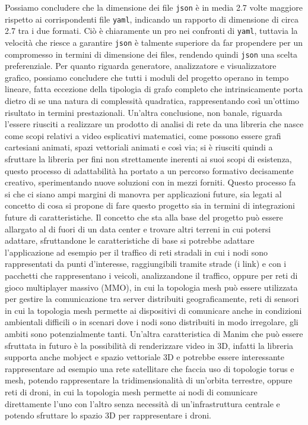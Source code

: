 \documentclass[binding=0.6cm]{sapthesis}
\begin{document}
Possiamo concludere che la dimensione dei file \texttt{json} è in media 2.7 volte maggiore rispetto ai corrispondenti file \texttt{yaml}, 
indicando un rapporto di dimensione di circa 2.7 tra i due formati. Ciò è chiaramente un pro nei confronti di \texttt{yaml}, tuttavia la velocità che riesce a garantire \texttt{json} è talmente 
superiore da far propendere per un compromesso in termini di dimensione dei files, rendendo quindi \texttt{json} una scelta preferenziale.
Per quanto riguarda generatore, analizzatore e visualizzatore grafico, possiamo concludere che tutti i moduli del progetto operano in tempo lineare, fatta eccezione della tipologia di grafo completo che intrinsicamente porta dietro di se una natura di complessità quadratica,
rappresentando così un'ottimo risultato in termini prestazionali.
Un'altra conclusione, non banale, riguarda l'essere riusciti a realizzare un prodotto di analisi di rete da una libreria che nasce come scopi relativi a video esplicativi matematici, come possono essere grafi cartesiani animati, spazi vettoriali animati e così via;
si è riusciti quindi a sfruttare la libreria per fini non strettamente inerenti ai suoi scopi di esistenza, questo processo di adattabilità ha portato a un percorso formativo decisamente creativo, sperimentando nuove soluzioni con in mezzi forniti.
Questo processo fa si che ci siano ampi margini di manovra per applicazioni future, 
sia legati al concetto di cosa si propone di fare questo progetto sia in termini di integrazioni future di caratteristiche. 
Il concetto che sta alla base del progetto può essere allargato al di fuori di un data center e trovare
altri terreni in cui potersi adattare, sfruttandone le caratteristiche di base si potrebbe adattare l'applicazione ad esempio per il traffico di reti stradali in cui 
i nodi sono rappresentati da punti d'interesse, raggiungibili tramite strade (i link) e con i pacchetti che rappresentano i veicoli, analizzandone il traffico, oppure per reti di gioco multiplayer massivo (MMO), in cui la topologia mesh può essere utilizzata per gestire la comunicazione tra server distribuiti geograficamente, reti di sensori 
in cui la topologia mesh permette ai dispositivi di comunicare anche in condizioni ambientali difficili o in scenari dove i nodi sono distribuiti in modo irregolare, gli ambiti sono potenzialmente tanti.
Un'altra caratteristica di Manim che può essere sfruttata in futuro è la possibilità di renderizzare video in 3D, infatti la libreria supporta anche mobject e spazio vettoriale 3D e potrebbe essere interessante rappresentare ad esempio una rete satellitare che faccia uso di topologie torus e mesh, potendo 
rappresentare la tridimensionalità di un'orbita terrestre, oppure reti di droni, in cui la topologia mesh permette ai nodi di comunicare direttamente l'uno con l'altro senza necessità di un'infrastruttura centrale e potendo sfruttare lo spazio 3D per rappresentare i droni.
\end{document}
